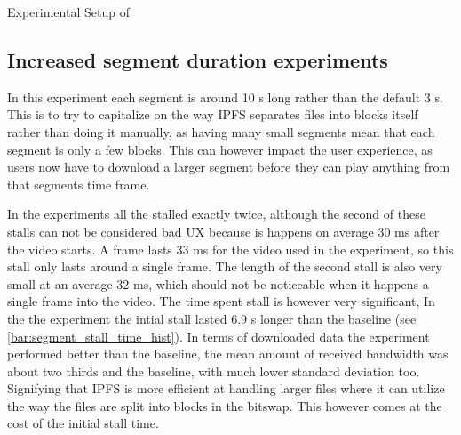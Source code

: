 \begin{table}[!htbp]
    \myfloatalign
    \caption[Experimental Setup of Segment size]{Experimental Setup of }
    \label{tab:exp_overview_video}
    
\end{table}

\subsection{Increased segment duration experiments}
\label{sec:eval_segment}

In this experiment each segment is around 10 \ac{s} long rather than the default 3 \ac{s}. This is to try to capitalize on the way \ac{IPFS} separates files into blocks itself rather than doing it manually, as having many small segments mean that each segment is only a few blocks. This can however impact the user experience, as users now have to download a larger segment before they can play anything from that segments time frame.

In the experiments all the stalled exactly twice, although the second of these stalls can not be considered bad \ac{UX} because is happens on average 30 \ac{ms} after the video starts. A frame lasts 33 \ac{ms} for the video used in the experiment, so this stall only lasts around a single frame. The length of the second stall is also very small at an average 32 \ac{ms}, which should not be noticeable when it happens a single frame into the video. The time spent stall is however very significant, In the the experiment the intial stall lasted 6.9 \ac{s} longer than the baseline (see \autoref{bar:segment_stall_time_hist}). In terms of downloaded data the experiment performed better than the baseline, the mean amount of received bandwidth was about two thirds and the baseline, with much lower standard deviation too. Signifying that \ac{IPFS} is more efficient at handling larger files where it can utilize the way the files are split into blocks in the bitswap. This however comes at the cost of the initial stall time.

\if{}


\fi

